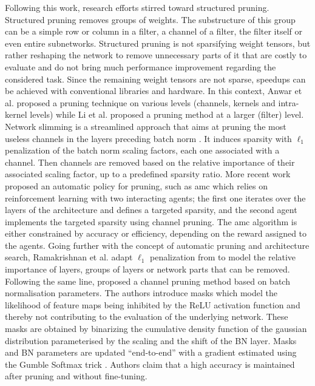 Following this work, research efforts stirred toward structured pruning.
Structured pruning removes groups of weights. The substructure of this group can
be a simple row or column in a filter, a channel of a filter, the filter itself
or even entire subnetworks. Structured pruning is not sparsifying weight
tensors, but rather reshaping the network to remove unnecessary parts of it that
are costly to evaluate and do not bring much performance improvement regarding
the considered task. Since the remaining weight tensors are not sparse, speedups
can be achieved with conventional libraries and hardware. In this context, Anwar
et al. \cite{anwar2017structured} proposed a pruning technique on various levels
(channels, kernels and intra-kernel levels) while Li et al.
\cite{DBLP:conf/iclr/0022KDSG17} proposed a pruning method at a larger (filter)
level. Network slimming \cite{DBLP:conf/iccv/LiuLSHYZ17} is a streamlined
approach that aims at pruning the most useless channels in the layers preceding
\ac{batch norm} \cite{DBLP:conf/icml/IoffeS15}. It induces sparsity with
$\ell_1$ penalization of the \ac{batch norm} scaling factors, each one
associated with a channel. Then channels are removed based on the relative
importance of their associated scaling factor, up to a predefined sparsity
ratio. More recent work proposed an automatic policy for pruning, such as
\ac{amc} \cite{DBLP:conf/eccv/HeLLWLH18} which relies on reinforcement learning
with two interacting agents; the first one iterates over the layers of the
architecture and defines a targeted sparsity, and the second agent implements
the targeted sparsity using channel pruning. The \ac{amc} algorithm is either
constrained by accuracy or efficiency, depending on the reward assigned to the
agents.  Going further with the concept of automatic pruning and architecture
search, Ramakrishnan et al. \cite{DBLP:conf/crv/RamakrishnanSN20} adapt $\ell_1$
penalization from \cite{DBLP:conf/iccv/LiuLSHYZ17} to model the relative
importance of layers, groups of layers or network parts that can be removed.
Following the same line, \cite{DBLP:conf/icml/KangH20} proposed a channel
pruning method based on batch normalisation parameters. The authors introduce
masks which model the likelihood of feature maps being inhibited by the ReLU
activation function and thereby not contributing to the evaluation of the
underlying network. These masks are obtained by binarizing the cumulative
density function of the gaussian distribution parameterised by the scaling and
the shift of the BN layer. Masks and BN parameters are updated “end-to-end” with
a gradient estimated using the Gumble Softmax trick
\cite{DBLP:conf/iclr/JangGP17}. Authors claim that a high accuracy is maintained
after pruning and without fine-tuning. \\



